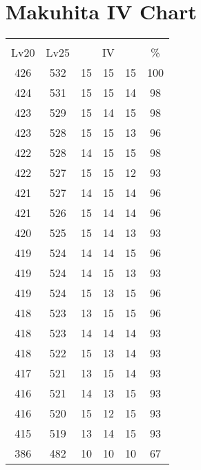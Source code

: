 \documentclass{article}%
\begin{document}
%
\normalsize%
\section{Makuhita IV Chart}%
\label{sec:Makuhita IV Chart}%
\renewcommand{\arraystretch}{1.5}%
\begin{tabular}{|c|c|c|c|c|c|}%
\hline%
\multicolumn{6}{|c|}{\textcolor{white}{ 
\linebreak{Makuhita}
}%
\cellcolor{black}}\\%
\multicolumn{1}{|c}{Lv20}&\multicolumn{1}{c|}{Lv25}&\multicolumn{3}{c|}{IV}&\multicolumn{1}{|c|}{\%}\\%
\hline%
\rowcolor{color100}%
426&532&15&15&15&100\\%
\hline%
\rowcolor{color98}%
424&531&15&15&14&98\\%
\hline%
\rowcolor{color98}%
423&529&15&14&15&98\\%
\hline%
\rowcolor{color96}%
423&528&15&15&13&96\\%
\hline%
\rowcolor{color98}%
422&528&14&15&15&98\\%
\hline%
\rowcolor{color93}%
422&527&15&15&12&93\\%
\hline%
\rowcolor{color96}%
421&527&14&15&14&96\\%
\hline%
\rowcolor{color96}%
421&526&15&14&14&96\\%
\hline%
\rowcolor{color93}%
420&525&15&14&13&93\\%
\hline%
\rowcolor{color96}%
419&524&14&14&15&96\\%
\hline%
\rowcolor{color93}%
419&524&14&15&13&93\\%
\hline%
\rowcolor{color96}%
419&524&15&13&15&96\\%
\hline%
\rowcolor{color96}%
418&523&13&15&15&96\\%
\hline%
\rowcolor{color93}%
418&523&14&14&14&93\\%
\hline%
\rowcolor{color93}%
418&522&15&13&14&93\\%
\hline%
\rowcolor{color93}%
417&521&13&15&14&93\\%
\hline%
\rowcolor{color93}%
416&521&14&13&15&93\\%
\hline%
\rowcolor{color93}%
416&520&15&12&15&93\\%
\hline%
\rowcolor{color93}%
415&519&13&14&15&93\\%
\hline%
\rowcolor{color91}%
386&482&10&10&10&67\\%
\end{tabular}

%
\end{document}
